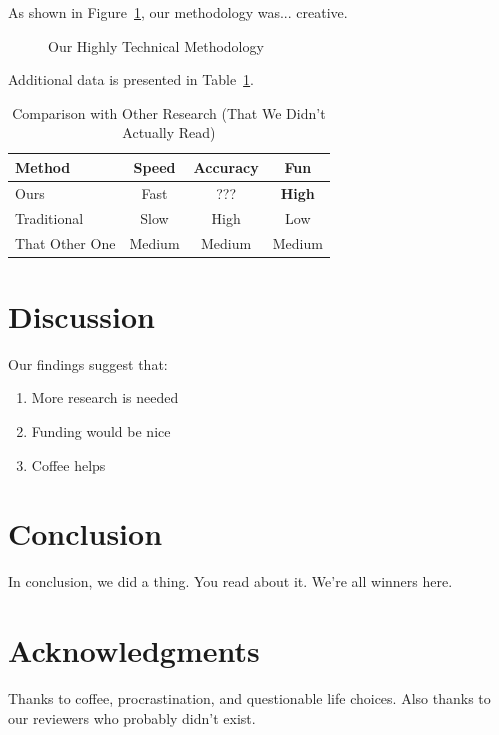 \documentclass{trw}
\begin{document}
As shown in Figure~\ref{fig:methodology}, our methodology was... creative.

\begin{figure}[H]
\centering
{}
\caption{Our Highly Technical Methodology}
\label{fig:methodology}
\end{figure}

Additional data is presented in Table~\ref{tab:comparison}.

\begin{table}[H]
\centering
\caption{Comparison with Other Research (That We Didn't Actually Read)}
\label{tab:comparison}
\begin{tabular}{lccc}
\toprule
\textbf{Method} & \textbf{Speed} & \textbf{Accuracy} & \textbf{Fun} \\
\midrule
Ours            & Fast    & ???    & \textbf{High} \\
Traditional     & Slow    & High   & Low \\
That Other One  & Medium  & Medium & Medium \\
\bottomrule
\end{tabular}
\end{table}

\section{Discussion}

Our findings suggest that:
\begin{enumerate}
    \item More research is needed
    \item Funding would be nice
    \item Coffee helps~\cite{johnson2023coffee}
\end{enumerate}

\section{Conclusion}

In conclusion, we did a thing. You read about it. We're all winners here.

\section*{Acknowledgments}

Thanks to coffee, procrastination, and questionable life choices. Also thanks to our reviewers who probably didn't exist.


\end{document}
